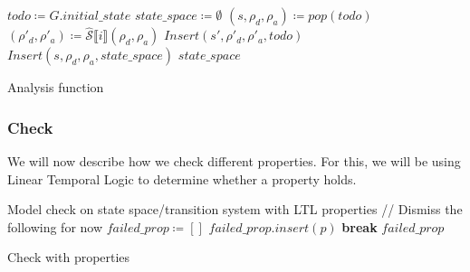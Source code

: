 \begin{algorithm}[htb!]
    \begin{codebox}
        \li $todo \coloneqq G.initial\_state$
        \li $state\_space \coloneqq \emptyset$
        \li {}
        \li \Do
        $(s,\rho_d,\rho_a) \coloneqq pop(todo)$
        \li {}
        \li \Do $(\rho'_d,\rho'_a) \coloneqq \widehat{\mathcal{S}}\lBrack i\rBrack(\rho_d,\rho_a)$
        \li {}
        \li \Do $Insert(s',\rho'_d,\rho'_a,todo)$
        \End
        \End
        \li $Insert(s,\rho_d,\rho_a,state\_space)$
        \End
        \End
        \End
        \End
        \li \Return $state\_space$
    \end{codebox}
    \caption{Analysis function}
    \label{alg:analysis}

\end{algorithm}

\subsubsection{Check}\label{subsubsec:check}

We will now describe how we check different properties.
For this, we will be using Linear Temporal Logic to determine whether a property holds.

\begin{algorithm}[htb!]
    \begin{codebox}
        \li Model check on state space/transition system
        \zi with LTL properties
        \li // Dismiss the following for now
        \li $failed\_prop \coloneqq []$
        \li {}
        \li \Do {}
        \li \Do {}
        \li \Do $failed\_prop.insert(p)$
        \End
        \End
        \li \textbf{break}
        \End
        \End
        \End
        \End
        \li \Return $failed\_prop$
    \end{codebox}
    \caption{Check with properties}
    \label{alg:check}
\end{algorithm}
